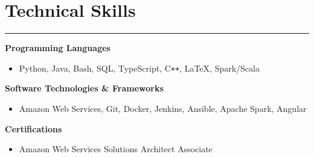 \documentclass[11pt]{article}
\newcommand{\resumesection}[1]{\vspace{-0.5cm}\section*{\LARGE#1}\vspace{-0.2cm}\hrule\vspace{0.2cm}}
\begin{document}
\vspace{0.2cm}
\resumesection{Technical Skills}

\textbf{Programming Languages}
\begin{itemize}
  \item Python, Java, Bash, SQL, TypeScript, C\texttt{++}, \LaTeX, Spark/Scala
\end{itemize}

\textbf{Software Technologies \& Frameworks}
\begin{itemize}
  \item{Amazon Web Services, Git, Docker, Jenkins, Ansible, Apache Spark, Angular}
\end{itemize}

\textbf{Certifications}
\begin{itemize}
  \item{Amazon Web Services Solutions Architect Associate}
\end{itemize}




\end{document}
